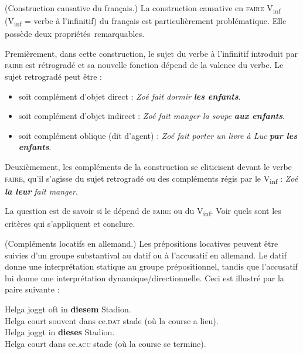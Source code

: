 {     (Construction causative du français.) La construction causative en \textsc{faire} V\textsubscript{inf}
     (V\textsubscript{inf} = verbe à l’infinitif) du français est particulièrement problématique. Elle possède deux propriétés~remarquables.

    Premièrement, dans cette construction, le sujet du verbe à l’infinitif introduit par \textsc{faire} est rétrogradé et sa nouvelle fonction dépend de la valence du verbe. Le sujet retrogradé peut être :
    \begin{itemize}
    \item  soit complément d’objet direct : \textit{Zoé fait dormir} \textbf{\textit{les enfants}}.
    \item  soit complément d’objet indirect : \textit{Zoé fait manger la soupe} \textbf{\textit{aux enfants}}.
    \item  soit complément oblique (dit d’agent) : \textit{Zoé fait porter un livre à Luc} \textbf{\textit{par les enfants}}.
    \end{itemize}
    Deuxièmement, les compléments de la construction se cliticisent devant le verbe \textsc{faire}, qu’il s’agisse du sujet retrogradé ou des compléments régis par le V\textsubscript{inf} : \textit{Zoé} \textbf{\textit{la leur}} \textit{fait manger}.

    La question est de savoir si le  dépend de \textsc{faire} ou du V\textsubscript{inf}. Voir quels sont les critères qui s’appliquent et conclure.

     (Compléments locatifs en allemand.) Les prépositions locatives peuvent être suivies d’un groupe substantival au datif ou à l’accusatif en allemand. Le datif donne une interprétation statique au groupe prépositionnel, tandis que l’accusatif lui donne une interprétation dynamique/directionnelle. Ceci est illustré par la paire suivante :

    \begin{exe}
    \gll   Helga joggt oft in \textbf{diesem} Stadion.\\
    Helga court souvent dans ce.\textsc{dat} stade (où la course a lieu).\\
    \gll   Helga joggt in \textbf{dieses} Stadion.\\
    Helga court dans ce.\textsc{acc} stade (où la course se termine).\\
    \end{exe}
    
}
